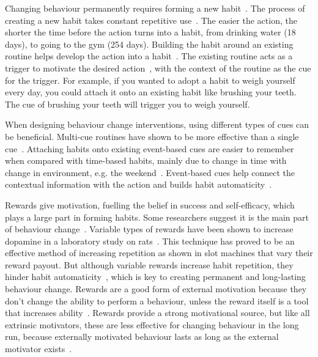 \documentclass{scaffold/sigchi}
\begin{document}
Changing behaviour permanently requires forming a new habit~\cite{article_experiences_of_habit_formation}. The process of creating a new habit takes constant repetitive use~\cite{article_how_habits_formed_modelling_habit_formation}. The easier the action, the shorter the time before the action turns into a habit, from drinking water (18 days), to going to the gym (254 days). Building the habit around an existing routine helps develop the action into a habit~\cite{habits_event_cues_1}. The existing routine acts as a trigger to motivate the desired action~\cite{habits_event_cues_2}, with the context of the routine as the cue for the trigger. For example, if you wanted to adopt a habit to weigh yourself every day, you could attach it onto an existing habit like brushing your teeth. The cue of brushing your teeth will trigger you to weigh yourself.


When designing behaviour change interventions, using different types of cues can be beneficial. Multi-cue routines have shown to be more effective than a single cue~\cite{article_understanding_use_contextual_cues_design_impl}. Attaching habits onto existing event-based cues are easier to remember~\cite{article_implementation_intentions_multicue} when compared with time-based habits, mainly due to change in time with change in environment, e.g. the weekend~\cite{coaching_not_that_good}. Event-based cues help connect the contextual information with the action and builds habit automaticity~\cite{article_implementation_intentions}.
 
Rewards give motivation, fuelling the belief in success and self-efficacy, which plays a large part in forming habits. Some researchers suggest it is the main part of behaviour change~\cite{article_a_self_efficacy}. Variable types of rewards have been shown to increase dopamine in a laboratory study on rats~\cite{variable_rewards_increases_dopamine}. This technique has proved to be an effective method of increasing repetition as shown in slot machines that vary their reward payout. But although variable rewards increase habit repetition, they hinder habit automaticity~\cite{variable_rewards_increases_dopamine}, which is key to creating permanent and long-lasting behaviour change. Rewards are a good form of external motivation because they don't change the ability to perform a behaviour, unless the reward itself is a tool that increases ability~\cite{article_taxonomy_motivational_affordances_meaningful}. Rewards provide a strong motivational source, but like all extrinsic motivators, these are less effective for changing behaviour in the long run, because externally motivated behaviour lasts as long as the external motivator exists~\cite{article_beyond_self_tracking_designing_apps}.
\end{document}
